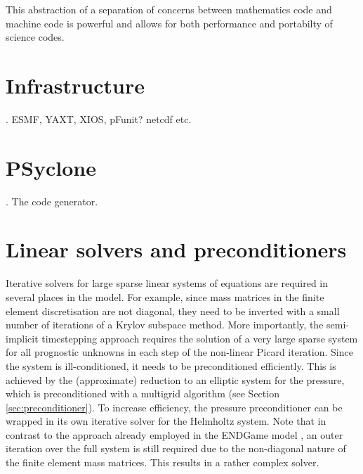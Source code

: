 \documentclass[times]{elsarticle}
\begin{document}
This abstraction of a separation of concerns between mathematics code
and machine code is powerful and allows for both performance and
portabilty of science codes.

\section{\label{sec:lib}Infrastructure}.
ESMF, YAXT, XIOS, pFunit? netcdf etc.

\section{\label{sec:Psyclone}PSyclone}.
The code generator.

\section{\label{sec:Solver}Linear solvers and preconditioners}
Iterative solvers for large sparse linear systems of equations are required in several places in the model. For example, since mass matrices in the finite element discretisation are not diagonal, they need to be inverted with a small number of iterations of a Krylov subspace method. More importantly, the semi-implicit timestepping approach requires the solution of a very large sparse system for all prognostic unknowns in each step of the non-linear Picard iteration. Since the system is ill-conditioned, it needs to be preconditioned efficiently. This is achieved by the (approximate) reduction to an elliptic system for the pressure, which is preconditioned with a multigrid algorithm (see Section \ref{sec:preconditioner}). To increase efficiency, the pressure preconditioner can be wrapped in its own iterative solver for the Helmholtz system. Note that in contrast to the  approach already employed in the ENDGame model \cite{QJ:QJ2235}, an outer iteration over the full system is still required due to the non-diagonal nature of the finite element mass matrices. This results in a rather complex solver.
\end{document}
